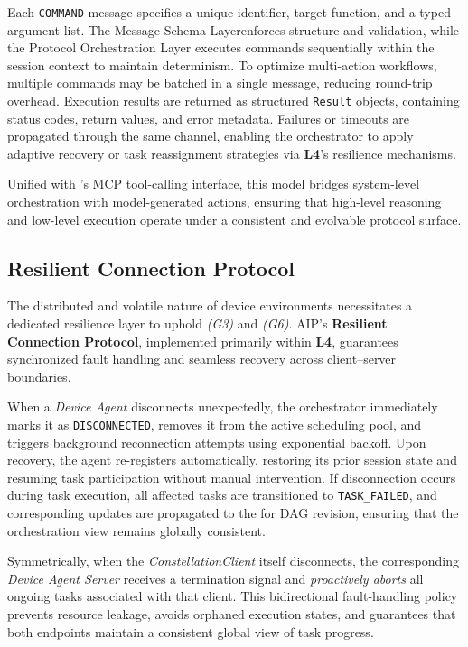 Each \texttt{COMMAND} message specifies a unique identifier, target function, and a typed argument list. The Message Schema Layerenforces structure and validation, while the Protocol Orchestration Layer executes commands sequentially within the session context to maintain determinism. To optimize multi-action workflows, multiple commands may be batched in a single message, reducing round-trip overhead. Execution results are returned as structured \texttt{Result} objects, containing status codes, return values, and error metadata. Failures or timeouts are propagated through the same channel, enabling the orchestrator to apply adaptive recovery or task reassignment strategies via \textbf{L4}'s resilience mechanisms.

Unified with \ufo's MCP tool-calling interface, this model bridges system-level orchestration with model-generated actions, ensuring that high-level reasoning and low-level execution operate under a consistent and evolvable protocol surface.

\subsection{Resilient Connection Protocol}
\label{subsec:aip-resilience}

The distributed and volatile nature of device environments necessitates a dedicated resilience layer to uphold \textit{(G3)} and \textit{(G6)}. AIP's \textbf{Resilient Connection Protocol}, implemented primarily within \textbf{L4}, guarantees synchronized fault handling and seamless recovery across client–server boundaries.

When a \textit{Device Agent} disconnects unexpectedly, the orchestrator immediately marks it as \texttt{DISCONNECTED}, removes it from the active scheduling pool, and triggers background reconnection attempts using exponential backoff. Upon recovery, the agent re-registers automatically, restoring its prior session state and resuming task participation without manual intervention.
If disconnection occurs during task execution, all affected tasks are transitioned to \texttt{TASK\_FAILED}, and corresponding updates are propagated to the \cagent for DAG revision, ensuring that the orchestration view remains globally consistent.

Symmetrically, when the \textit{ConstellationClient} itself disconnects, the corresponding \textit{Device Agent Server} receives a termination signal and \emph{proactively aborts} all ongoing tasks associated with that client. This bidirectional fault-handling policy prevents resource leakage, avoids orphaned execution states, and guarantees that both endpoints maintain a consistent global view of task progress.

